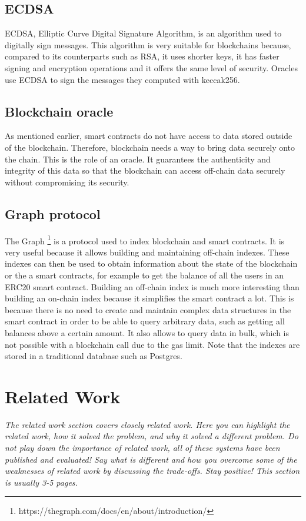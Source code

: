 \documentclass[a4paper,11pt,oneside]{report}
\begin{document}
\section{ECDSA}
ECDSA, Elliptic Curve Digital Signature Algorithm, is an algorithm used to digitally sign messages. This algorithm is very suitable for blockchains because, compared to its counterparts such as RSA, it uses shorter keys, it has faster signing and encryption operations and it offers the same level of security. Oracles use ECDSA to sign the messages they computed with keccak256.

\section{Blockchain oracle}
As mentioned earlier, smart contracts do not have access to data stored outside of the blockchain. Therefore, blockchain needs a way to bring data securely onto the chain. This is the role of an oracle. It guarantees the authenticity and integrity of this data so that the blockchain can access off-chain data securely without compromising its security.

\section{Graph protocol}
The Graph \footnote{https://thegraph.com/docs/en/about/introduction/} is a protocol used to index blockchain and smart contracts. It is very useful because it allows building and maintaining off-chain indexes. These indexes can then be used to obtain information about the state of the blockchain or the a smart contracts, for example to get the balance of all the users in an ERC20 smart contract. Building an off-chain index is much more interesting than building an on-chain index because it simplifies the smart contract a lot. This is because there is no need to create and maintain complex data structures in the smart contract in order to be able to query arbitrary data, such as getting all balances above a certain amount. It also allows to query data in bulk, which is not possible with a blockchain call due to the gas limit. Note that the indexes are stored in a traditional database such as Postgres.

\chapter{Related Work}

\textit{The related work section covers closely related work. Here you can highlight
the related work, how it solved the problem, and why it solved a different
problem. Do not play down the importance of related work, all of these
systems have been published and evaluated! Say what is different and how
you overcome some of the weaknesses of related work by discussing the 
trade-offs. Stay positive!
This section is usually 3-5 pages.} \\
\end{document}
